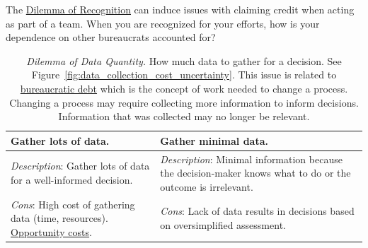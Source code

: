 The \hyperref[table:dilemma-personal-recognition-obscurity]{Dilemma of Recognition} can induce issues with claiming credit when acting as part of a team. When you are recognized for your efforts, how is your dependence on other bureaucrats accounted for?



\begin{center}
\begin{table}[H] %
\begin{tabular}{ | m{\dilemmatablewidth}| m{\dilemmatablewidth} | } 
  \hline
  \textbf{Gather lots of data.} &
  \textbf{Gather minimal data.} \\
  \hline
  \textit{Description}: Gather lots of data for a well-informed decision. &
  \textit{Description}: Minimal information because the decision-maker knows what to do or the outcome is irrelevant.  \\  
  \hline
  \textit{Cons}: High cost of gathering data (time, resources). \href{https://en.wikipedia.org/wiki/Opportunity_cost}{Opportunity costs}.
  \index{Wikipedia!opportunity cost@\href{https://en.wikipedia.org/wiki/Opportunity_cost}{opportunity cost}}
  & 
  \textit{Cons}: Lack of data results in decisions based on oversimplified assessment. \\
  \hline
\end{tabular}
\caption{
\textit{Dilemma of Data Quantity.}
How much data to gather for a decision. See Figure~\ref{fig:data_collection_cost_uncertainty}. This issue is related to  
\hyperref[sec:bureaucratic-debt]{bureaucratic debt}\iftoggle{haspagenumbers}{ (see  page~\pageref{sec:bureaucratic-debt}),}{,} which is the concept of work needed to change a process. Changing a process may require collecting more information to inform decisions. Information that was collected may no longer be relevant. 
}
\label{table:dilemma-personal-gather-data-lots-vs-little}
\end{table}
\end{center}

